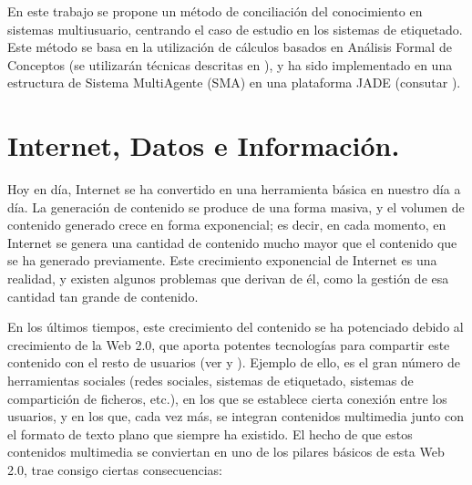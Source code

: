 En este trabajo se propone un método de conciliación del conocimiento en sistemas multiusuario, centrando el caso de estudio en los sistemas de etiquetado. Este método se basa en la utilización de cálculos basados en Análisis Formal de Conceptos (se utilizarán técnicas descritas en \cite{afc}), y ha sido implementado en una estructura de Sistema MultiAgente (SMA) en una plataforma JADE (consutar \cite{jade}).




\section*{Internet, Datos e Información.}

Hoy en día, Internet se ha convertido en una herramienta básica en nuestro día a día. La generación de contenido se produce de una forma masiva, y el volumen de contenido generado crece en forma exponencial; es decir, en cada momento, en Internet se genera una cantidad de contenido mucho mayor que el contenido que se ha generado previamente. Este crecimiento exponencial de Internet es una realidad, y existen algunos problemas que derivan de él, como la gestión de esa cantidad tan grande de contenido.

En los últimos tiempos, este crecimiento del contenido se ha potenciado debido al crecimiento de la Web 2.0, que aporta potentes tecnologías para compartir este contenido con el resto de usuarios (ver \cite{algoritmo} y \cite{mowento}). Ejemplo de ello, es el gran número de herramientas sociales (redes sociales, sistemas de etiquetado, sistemas de compartición de ficheros, etc.), en los que se establece cierta conexión entre los usuarios, y en los que, cada vez más, se integran contenidos multimedia junto con el formato de texto plano que siempre ha existido. El hecho de que estos contenidos multimedia se conviertan en uno de los pilares básicos de esta Web 2.0, trae consigo ciertas consecuencias:

